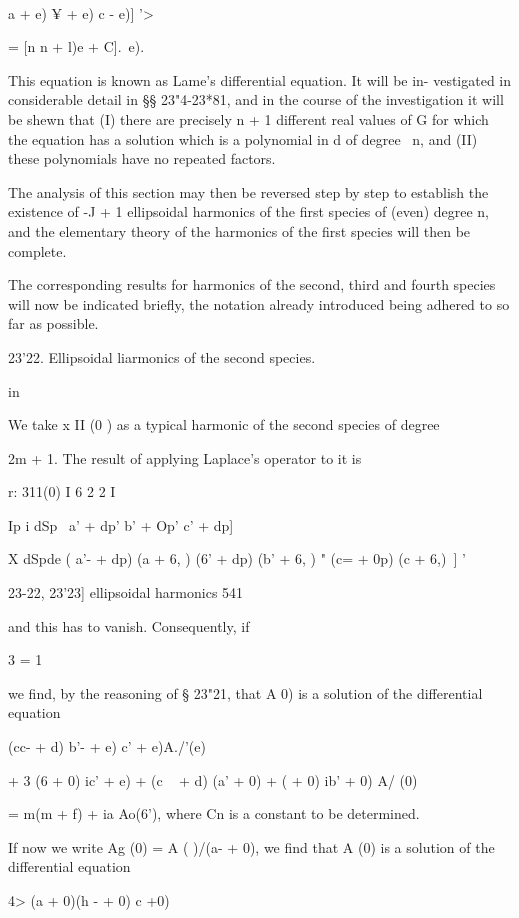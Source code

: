  \ \ {a + e) ¥ + e) c - e)] '>



= [n n + l)e + C].\, e).

This equation is known as Lame's differential equation. It will be in-
vestigated in considerable detail in §§ 23"4-23*81, and in the course
of the investigation it will be shewn that (I) there are precisely n +
1 different real values of G for which the equation has a solution
which is a polynomial in d of degree \ n, and (II) these polynomials
have no repeated factors.

The analysis of this section may then be reversed step by step to
establish the existence of -J + 1 ellipsoidal harmonics of the first
species of (even) degree n, and the elementary theory of the harmonics
of the first species will then be complete.

The corresponding results for harmonics of the second, third and
fourth species will now be indicated briefly, the notation already
introduced being adhered to so far as possible.

23'22. Ellipsoidal liarmonics of the second species.

in

We take x II (0 ) as a typical harmonic of the second species of
degree

2m + 1. The result of applying Laplace's operator to it is

r: 311(0) I 6 2 2 I

 Ip i dSp \ a' + dp' b' + Op' c' + dp]

   X dSpde ( a'- + dp) (a + 6, ) (6' + dp) (b' + 6, ) " (c= + 0p) (c +
6,)\ ] '



23-22, 23'23] ellipsoidal harmonics 541

and this has to vanish. Consequently, if

3 = 1

we find, by the reasoning of § 23"21, that A 0) is a solution of the
differential equation

(cc- + d) b'- + e) c' + e)A./'(e)

+ 3 (6 + 0) ic' + e) + (c ~ + d) (a' + 0) + ( + 0) ib' + 0) A/ (0)

= m(m + f) + ia Ao(6'), where Cn is a constant to be determined.

If now we write Ag (0) = A ( )/\/(a- + 0), we find that A (0) is a
solution of the differential equation



4> (a + 0)(h - + 0) c +0)



}
